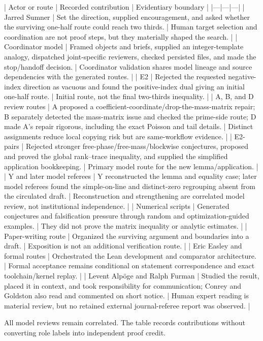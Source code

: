 \documentclass[11pt]{article}
\begin{document}
\begin{markdown}
| Actor or route | Recorded contribution | Evidentiary boundary |
|---|---|---|
| Jarred Sumner | Set the direction, supplied encouragement, and asked whether the surviving one-half route could reach two thirds. | Human target selection and coordination are not proof steps, but they materially shaped the search. |
| Coordinator model | Framed objects and briefs, supplied an integer-template analogy, dispatched joint-specific reviewers, checked persisted files, and made the stop/handoff decision. | Coordinator validation shares model lineage and source dependencies with the generated routes. |
| E2 | Rejected the requested negative-index direction as vacuous and found the positive-index dual giving an initial one-half route. | Initial route, not the final two-thirds inequality. |
| A, B, and D review routes | A proposed a coefficient-coordinate/drop-the-mass-matrix repair; B separately detected the mass-matrix issue and checked the prime-side route; D made A's repair rigorous, including the exact Poisson and tail details. | Distinct assignments reduce local copying risk but are same-workflow evidence. |
| E2-pairs | Rejected stronger free-phase/free-mass/blockwise conjectures, proposed and proved the global rank--trace inequality, and supplied the simplified application bookkeeping. | Primary model route for the new lemma/application. |
| Y and later model referees | Y reconstructed the lemma and equality case; later model referees found the simple-on-line and distinct-zero regrouping absent from the circulated draft. | Reconstruction and strengthening are correlated model review, not institutional independence. |
| Numerical scripts | Generated conjectures and falsification pressure through random and optimization-guided examples. | They did not prove the matrix inequality or analytic estimates. |
| Paper-writing route | Organized the surviving argument and boundaries into a draft. | Exposition is not an additional verification route. |
| Eric Easley and formal routes | Orchestrated the Lean development and comparator architecture. | Formal acceptance remains conditional on statement correspondence and exact toolchain/kernel replay. |
| Levent Alpöge and Ralph Furman | Studied the result, placed it in context, and took responsibility for communication; Conrey and Goldston also read and commented on short notice. | Human expert reading is material review, but no retained external journal-referee report was observed. |

All model reviews remain correlated. The table records contributions without converting role
labels into independent proof credit.


\end{markdown}
\end{document}
